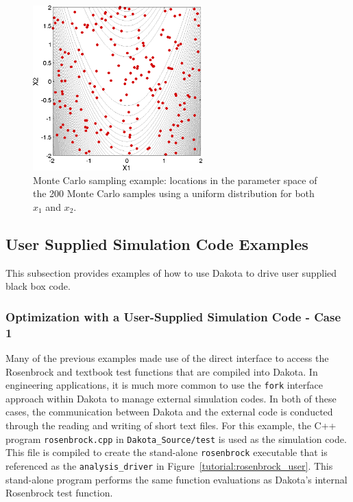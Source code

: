 \begin{figure}[ht!]
  \centering
  \includegraphics[height=2.5in]{images/rosen_nond_pts}
  \caption{Monte Carlo sampling example: locations in the parameter
    space of the 200 Monte Carlo samples using a uniform distribution
    for both $x_1$ and $x_2$.}
  \label{tutorial:rosenbrock_mc_points}
\end{figure}

\subsection{User Supplied Simulation Code Examples}\label{tutorial:examples:user_supply}
This subsection provides examples of how to use Dakota to drive user 
supplied black box code.

\subsubsection{Optimization with a User-Supplied Simulation Code - Case 1}\label{tutorial:examples:user_supply:optimization1}

Many of the previous examples made use of the direct interface to
access the Rosenbrock and textbook test functions that are compiled
into Dakota. In engineering applications, it is much more common to
use the \texttt{fork} interface approach within
Dakota to manage external simulation codes. In both of these cases,
the communication between Dakota and the external code is conducted
through the reading and writing of short text files. For this example,
the C++ program \texttt{rosenbrock.cpp} in \texttt{Dakota\_Source/test} is used
as the simulation code. This file is compiled to create the
stand-alone \texttt{rosenbrock} executable that is referenced as the
\texttt{analysis\_driver} in Figure~\ref{tutorial:rosenbrock_user}.
This stand-alone program performs the same function evaluations as
Dakota's internal Rosenbrock test function.

